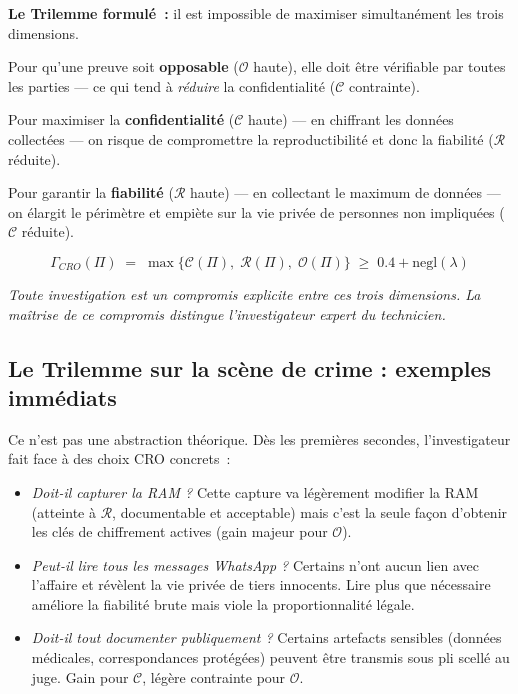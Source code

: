 \begin{boxCRO}
\textbf{Le Trilemme formulé~:} il est impossible de maximiser simultanément
les trois dimensions.

\medskip
Pour qu'une preuve soit \textbf{opposable} ($\mathcal{O}$ haute), elle doit
être vérifiable par toutes les parties --- ce qui tend à \emph{réduire} la
confidentialité ($\mathcal{C}$ contrainte).

Pour maximiser la \textbf{confidentialité} ($\mathcal{C}$ haute) --- en
chiffrant les données collectées --- on risque de compromettre la
reproductibilité et donc la fiabilité ($\mathcal{R}$ réduite).

Pour garantir la \textbf{fiabilité} ($\mathcal{R}$ haute) --- en collectant
le maximum de données --- on élargit le périmètre et empiète sur la vie
privée de personnes non impliquées ($\mathcal{C}$ réduite).

\[
\Gamma_{CRO}(\Pi) \;=\; \max\bigl\{\mathcal{C}(\Pi),\;
\mathcal{R}(\Pi),\; \mathcal{O}(\Pi)\bigr\}
\;\geq\; 0.4 + \mathrm{negl}(\lambda)
\]

\textit{Toute investigation est un compromis explicite entre ces trois
dimensions. La maîtrise de ce compromis distingue l'investigateur expert
du technicien.}
\end{boxCRO}

\subsection{Le Trilemme sur la scène de crime : exemples immédiats}

Ce n'est pas une abstraction théorique. Dès les premières secondes,
l'investigateur fait face à des choix CRO concrets~:

\begin{itemize}
    \item \textit{Doit-il capturer la RAM ?} Cette capture va légèrement
          modifier la RAM (atteinte à $\mathcal{R}$, documentable et
          acceptable) mais c'est la seule façon d'obtenir les clés de
          chiffrement actives (gain majeur pour $\mathcal{O}$).
          \hfill{}

    \item \textit{Peut-il lire tous les messages WhatsApp ?} Certains n'ont
          aucun lien avec l'affaire et révèlent la vie privée de tiers
          innocents. Lire plus que nécessaire améliore la fiabilité brute
          mais viole la proportionnalité légale.
          \hfill\cro{$\downarrow$}{$\uparrow$}{$\sim$}

    \item \textit{Doit-il tout documenter publiquement ?} Certains artefacts
          sensibles (données médicales, correspondances protégées) peuvent
          être transmis sous pli scellé au juge. Gain pour $\mathcal{C}$,
          légère contrainte pour $\mathcal{O}$.
          \hfill{}
\end{itemize}

